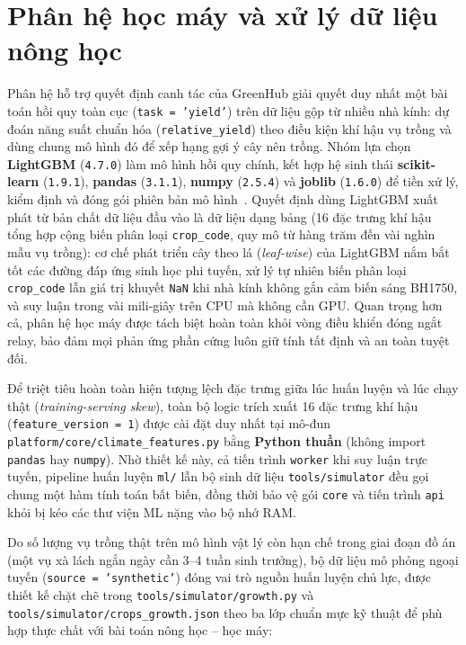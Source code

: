 \section{Phân hệ học máy và xử lý dữ liệu nông học}
\label{sec:c2-ml}

Phân hệ hỗ trợ quyết định canh tác của GreenHub giải quyết duy nhất một bài toán hồi quy toàn cục (\texttt{task = 'yield'}) trên dữ liệu gộp từ nhiều nhà kính: dự đoán năng suất chuẩn hóa (\texttt{relative\_yield}) theo điều kiện khí hậu vụ trồng và dùng chung mô hình đó để xếp hạng gợi ý cây nên trồng. Nhóm lựa chọn \textbf{LightGBM} (\texttt{4.7.0}) làm mô hình hồi quy chính, kết hợp hệ sinh thái \textbf{scikit-learn} (\texttt{1.9.1}), \textbf{pandas} (\texttt{3.1.1}), \textbf{numpy} (\texttt{2.5.4}) và \textbf{joblib} (\texttt{1.6.0}) để tiền xử lý, kiểm định và đóng gói phiên bản mô hình~\cite{lightgbmPaper,scikitLearnDocs}. Quyết định dùng LightGBM xuất phát từ bản chất dữ liệu đầu vào là dữ liệu dạng bảng (16 đặc trưng khí hậu tổng hợp cộng biến phân loại \texttt{crop\_code}, quy mô từ hàng trăm đến vài nghìn mẫu vụ trồng): cơ chế phát triển cây theo lá (\textit{leaf-wise}) của LightGBM nắm bắt tốt các đường đáp ứng sinh học phi tuyến, xử lý tự nhiên biến phân loại \texttt{crop\_code} lẫn giá trị khuyết \texttt{NaN} khi nhà kính không gắn cảm biến sáng BH1750, và suy luận trong vài mili-giây trên CPU mà không cần GPU. Quan trọng hơn cả, phân hệ học máy được tách biệt hoàn toàn khỏi vòng điều khiển đóng ngắt relay, bảo đảm mọi phản ứng phần cứng luôn giữ tính tất định và an toàn tuyệt đối.

Để triệt tiêu hoàn toàn hiện tượng lệch đặc trưng giữa lúc huấn luyện và lúc chạy thật (\textit{training-serving skew}), toàn bộ logic trích xuất 16 đặc trưng khí hậu (\texttt{feature\_version = 1}) được cài đặt duy nhất tại mô-đun \texttt{platform/core/climate\_features.py} bằng \textbf{Python thuần} (không import \texttt{pandas} hay \texttt{numpy}). Nhờ thiết kế này, cả tiến trình \texttt{worker} khi suy luận trực tuyến, pipeline huấn luyện \texttt{ml/} lẫn bộ sinh dữ liệu \texttt{tools/simulator} đều gọi chung một hàm tính toán bất biến, đồng thời bảo vệ gói \texttt{core} và tiến trình \texttt{api} khỏi bị kéo các thư viện ML nặng vào bộ nhớ RAM.

Do số lượng vụ trồng thật trên mô hình vật lý còn hạn chế trong giai đoạn đồ án (một vụ xà lách ngắn ngày cần 3--4 tuần sinh trưởng), bộ dữ liệu mô phỏng ngoại tuyến (\texttt{source = 'synthetic'}) đóng vai trò nguồn huấn luyện chủ lực, được thiết kế chặt chẽ trong \texttt{tools/simulator/growth.py} và \texttt{tools/simulator/crops\_growth.json} theo ba lớp chuẩn mực kỹ thuật để phù hợp thực chất với bài toán nông học -- học máy:

